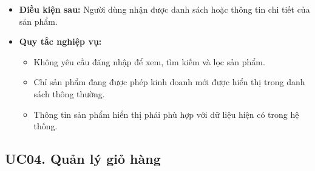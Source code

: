 \documentclass[12pt,a4paper]{article}
\begin{document}
\begin{itemize}
\begin{itemize}
  \item Nếu không tìm thấy sản phẩm phù hợp, hệ thống thông báo hoặc hiển thị danh sách kết quả trống.

  \item Sản phẩm ngừng kinh doanh không được hiển thị trong danh sách sản phẩm dành cho khách hàng.

  \item Sản phẩm hết hàng vẫn có thể được hiển thị nhưng phải thể hiện rõ tình trạng hết hàng.

 \end{itemize}

 \item \textbf{Điều kiện sau:} Người dùng nhận được danh sách hoặc thông tin chi tiết của sản phẩm.

 \item \textbf{Quy tắc nghiệp vụ:}

 \begin{itemize}

  \item Không yêu cầu đăng nhập để xem, tìm kiếm và lọc sản phẩm.

  \item Chỉ sản phẩm đang được phép kinh doanh mới được hiển thị trong danh sách thông thường.

  \item Thông tin sản phẩm hiển thị phải phù hợp với dữ liệu hiện có trong hệ thống.

 \end{itemize}

\end{itemize}


\subsection*{UC04. Quản lý giỏ hàng}
\end{document}
